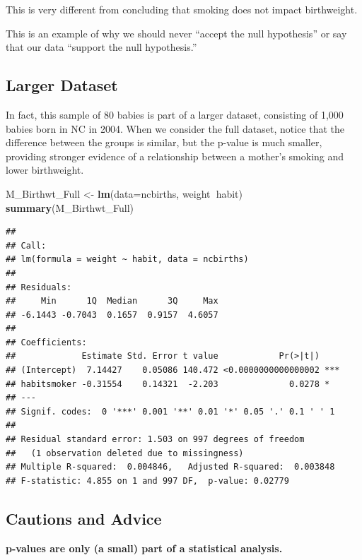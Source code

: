 \documentclass[]{book}
\newenvironment{Shaded}{\begin{snugshade}}{\end{snugshade}}
\newcommand{\KeywordTok}[1]{\textcolor[rgb]{0.13,0.29,0.53}{\textbf{#1}}}
\newcommand{\DataTypeTok}[1]{\textcolor[rgb]{0.13,0.29,0.53}{#1}}
\newcommand{\StringTok}[1]{\textcolor[rgb]{0.31,0.60,0.02}{#1}}
\newcommand{\OperatorTok}[1]{\textcolor[rgb]{0.81,0.36,0.00}{\textbf{#1}}}
\newcommand{\NormalTok}[1]{#1}
\begin{document}
This is very different from concluding that smoking does not impact
birthweight.

This is an example of why we should never ``accept the null hypothesis''
or say that our data ``support the null hypothesis.''

\subsection{Larger Dataset}\label{larger-dataset}

In fact, this sample of 80 babies is part of a larger dataset,
consisting of 1,000 babies born in NC in 2004. When we consider the full
dataset, notice that the difference between the groups is similar, but
the p-value is much smaller, providing stronger evidence of a
relationship between a mother's smoking and lower birthweight.

\begin{Shaded}
\begin{Highlighting}[]
\NormalTok{M_Birthwt_Full <-}\StringTok{ }\KeywordTok{lm}\NormalTok{(}\DataTypeTok{data=}\NormalTok{ncbirths, weight}\OperatorTok{~}\NormalTok{habit)}
\KeywordTok{summary}\NormalTok{(M_Birthwt_Full)}
\end{Highlighting}
\end{Shaded}

\begin{verbatim}
## 
## Call:
## lm(formula = weight ~ habit, data = ncbirths)
## 
## Residuals:
##     Min      1Q  Median      3Q     Max 
## -6.1443 -0.7043  0.1657  0.9157  4.6057 
## 
## Coefficients:
##             Estimate Std. Error t value            Pr(>|t|)    
## (Intercept)  7.14427    0.05086 140.472 <0.0000000000000002 ***
## habitsmoker -0.31554    0.14321  -2.203              0.0278 *  
## ---
## Signif. codes:  0 '***' 0.001 '**' 0.01 '*' 0.05 '.' 0.1 ' ' 1
## 
## Residual standard error: 1.503 on 997 degrees of freedom
##   (1 observation deleted due to missingness)
## Multiple R-squared:  0.004846,   Adjusted R-squared:  0.003848 
## F-statistic: 4.855 on 1 and 997 DF,  p-value: 0.02779
\end{verbatim}

\subsection{Cautions and Advice}\label{cautions-and-advice}

\textbf{p-values are only (a small) part of a statistical analysis.}
\end{document}
